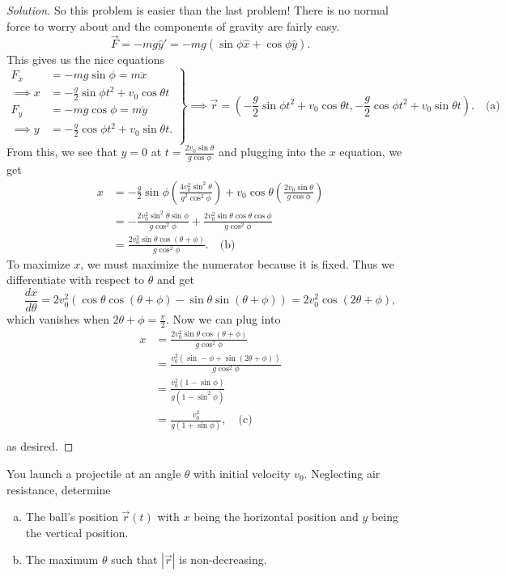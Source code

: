 \documentclass{article}
\begin{document}
\begin{proof}[Solution]
So this problem is easier than the last problem! There is no normal
force to worry about and the components of gravity are fairly easy.
\[ \vec{F} = -mg \hat{y}' = -mg (\sin \phi \hat{x} + \cos \phi \hat{y}).
\]
This gives us the nice equations
\[ \left.\begin{aligned}
F_x &= -mg \sin \phi = m \ddot{x} \\
\implies x &= -\frac{g}{2} \sin \phi t^2 + v_0 \cos \theta t \\
F_y &= -mg \cos \phi = m \ddot{y} \\
\implies y &= -\frac{g}{2} \cos \phi t^2 + v_0 \sin \theta t. \\
\end{aligned} \right \rbrace
\implies
\boxed{\vec{r} = \left(-\frac{g}{2} \sin \phi t^2 + v_0 \cos \theta t,
-\frac{g}{2} \cos \phi t^2 + v_0 \sin \theta t\right)}. \quad
\textrm{(a)} \]
From this, we see that $y = 0$ at $t = \frac{2 v_0 \sin \theta}{g \cos
\phi}$ and plugging into the $x$ equation, we get
\[ \begin{aligned}
x &= -\frac{g}{2} \sin \phi \left(\frac{4 v_0^2 \sin^2 \theta}{g^2
\cos^2 \phi}\right) + v_0 \cos \theta \left(\frac{2 v_0 \sin \theta}{g
\cos \phi}\right) \\
&= -\frac{2 v_0^2 \sin^2 \theta \sin \phi}{g \cos^2 \phi} + \frac{2
v_0^2 \sin \theta \cos \theta \cos \phi}{g \cos^2 \phi} \\
&= \boxed{\frac{2 v_0^2 \sin \theta \cos(\theta + \phi)}{g \cos^2
\phi}}. \quad \textrm{(b)}
\end{aligned} \]
To maximize $x$, we must maximize the numerator because it is fixed.
Thus we differentiate with respect to $\theta$ and get
\[ \frac{dx}{d \theta} = 2 v_0^2 (\cos \theta \cos(\theta + \phi) - \sin
\theta \sin(\theta + \phi)) = 2 v_0^2 \cos (2 \theta + \phi), \]
which vanishes when $2 \theta + \phi = \frac{\pi}{2}$. Now we
can plug into
\[ \begin{aligned}
x &= \frac{2 v_0^2 \sin \theta \cos(\theta + \phi)}{g \cos^2 \phi} \\
&= \frac{v_0^2 (\sin -\phi + \sin(2 \theta + \phi))}{g \cos^2 \phi} \\
&= \frac{v_0^2 (1 - \sin \phi)}{g (1 - \sin^2 \phi)} \\
&= \boxed{\frac{v_0^2}{g (1 + \sin \phi)}}, \quad \textrm{(c)} \\
\end{aligned} \]
as desired.
\end{proof}

\begin{prb}
You launch a projectile at an angle $\theta$ with initial velocity
$v_0$. Neglecting air resistance, determine
\begin{enumerate}[(a)]
\item The ball's position $\vec{r}(t)$ with $x$ being the horizontal
position and $y$ being the vertical position.
\item The maximum $\theta$ such that $|\vec{r}|$ is non-decreasing.
\end{enumerate}
\end{prb}
\end{document}
